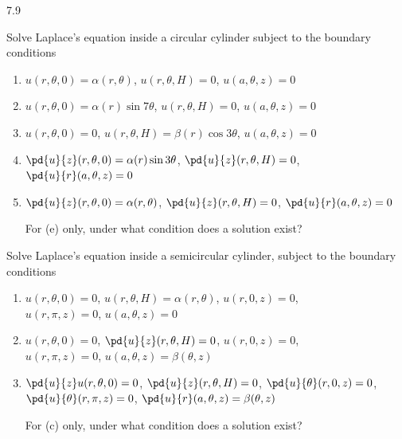 \begin{exercises}{7.9}

\item Solve Laplace's equation inside a circular cylinder subject to the boundary conditions

\begin{enumerate}
\item[(a)] $u(r,\theta,0) = \alpha(r,\theta)$, \quad $u(r,\theta,H) = 0$, \quad $u(a,\theta,z) = 0$

\item[\starred(b)] $u(r,\theta,0) = \alpha(r)\sin 7\theta$, \quad $u(r,\theta,H) = 0$, \quad $u(a,\theta,z) = 0$

\item[(c)] $u(r,\theta,0) = 0$, \quad $u(r,\theta,H) = \beta(r)\cos 3\theta$, \quad $u(a,\theta,z) = 0$

\item[(d)] $\pd{u}{z}(r,\theta,0) = \alpha(r)\sin 3\theta$, \quad $\pd{u}{z}(r,\theta,H) = 0$, \quad $\pd{u}{r}(a,\theta,z) = 0$

\item[(e)] $\pd{u}{z}(r,\theta,0) = \alpha(r,\theta)$, \quad $\pd{u}{z}(r,\theta,H) = 0$, \quad $\pd{u}{r}(a,\theta,z) = 0$

For (e) only, under what condition does a solution exist?
\end{enumerate}

\item Solve Laplace's equation inside a semicircular cylinder, subject to the boundary conditions

\begin{enumerate}
\item[(a)] $u(r,\theta,0) = 0$, \quad $u(r,\theta,H) = \alpha(r,\theta)$, \quad $u(r,0,z) = 0$, \\
$u(r,\pi,z) = 0$, \quad $u(a,\theta,z) = 0$

\item[\starred(b)] $u(r,\theta,0) = 0$, \quad $\pd{u}{z}(r,\theta,H) = 0$, \quad $u(r,0,z) = 0$, \\
$u(r,\pi,z) = 0$, \quad $u(a,\theta,z) = \beta(\theta,z)$

\item[(c)] $\pd{u}{z}u(r,\theta,0) = 0$, \quad $\pd{u}{z}(r,\theta,H) = 0$, \quad $\pd{u}{\theta}(r,0,z) = 0$, \\
$\pd{u}{\theta}(r,\pi,z) = 0$, \quad $\pd{u}{r}(a,\theta,z) = \beta(\theta,z)$

For (c) only, under what condition does a solution exist?


\end{enumerate}
\end{exercises}
